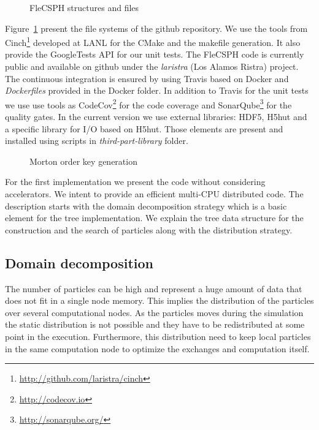 \begin{figure}[t!]
\centering

\caption{FleCSPH structures and files}
\label{fig:files_flecsph}
\end{figure}

Figure~\ref{fig:files_flecsph} present the file systems of the github repository. 
We use the tools from Cinch\footnote{\url{http://github.com/laristra/cinch}} developed at LANL for the CMake and the makefile generation. 
It also provide the GoogleTests API for our unit tests. 
The FleCSPH code is currently public and available on github under the \textit{laristra} (Los Alamos Ristra) project.
The continuous integration is ensured by using Travis based on Docker and \textit{Dockerfiles} provided in the Docker folder. 
In addition to Travis for the unit tests we use use tools as CodeCov\footnote{\url{http://codecov.io}} for the code coverage and SonarQube\footnote{\url{http://sonarqube.org/}} for the quality gates. 
In the current version we use external libraries: HDF5, H5hut and a specific library for I/O based on H5hut. 
Those elements are present and installed using scripts in \textit{third-part-library} folder. 

\begin{figure}[t!]
\centering

\caption{Morton order key generation}
\end{figure}

For the first implementation we present the code without considering accelerators. 
We intent to provide an efficient multi-CPU distributed code. 
The description starts with the domain decomposition strategy which is a basic element for the tree implementation.
We explain the tree data structure for the construction and the search of particles along with the distribution strategy.

\subsection{Domain decomposition}
\label{sec:domain_decomposition}
The number of particles can be high and represent a huge amount of data that does not fit in a single node memory. 
This implies the distribution of the particles over several computational nodes. 
As the particles moves during the simulation the static distribution is not possible and they have to be redistributed at some point in the execution. 
Furthermore, this distribution need to keep local particles in the same computation node to optimize the exchanges and computation itself.


